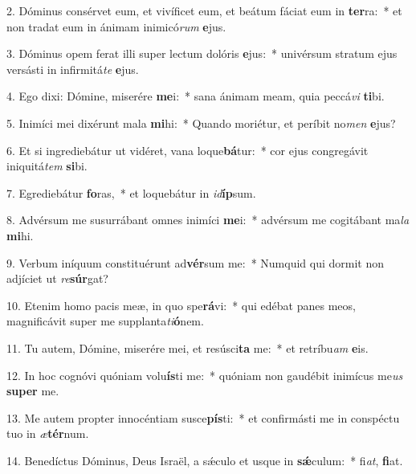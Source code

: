 2. Dóminus consérvet eum, et vivíficet eum, et beátum fáciat eum in \textbf{ter}ra:~*  et non tradat eum in ánimam inimicó\textit{rum} \textbf{e}jus.\

3. Dóminus opem ferat illi super lectum dolóris \textbf{e}jus:~*  univérsum stratum ejus versásti in infirmitá\textit{te} \textbf{e}jus.\

4. Ego dixi: Dómine, miserére \textbf{me}i:~*  sana ánimam meam, quia peccá\textit{vi} \textbf{ti}bi.\

5. Inimíci mei dixérunt mala \textbf{mi}hi:~*  Quando moriétur, et períbit no\textit{men} \textbf{e}jus?\

6. Et si ingrediebátur ut vidéret, vana loque\textbf{bá}tur:~*  cor ejus congregávit iniquitá\textit{tem} \textbf{si}bi.\

7. Egrediebátur \textbf{fo}ras,~*  et loquebátur in \textit{id}\textbf{íp}sum.\

8. Advérsum me susurrábant omnes inimíci \textbf{me}i:~*  advérsum me cogitábant ma\textit{la} \textbf{mi}hi.\

9. Verbum iníquum constituérunt ad\textbf{vér}sum me:~*  Numquid qui dormit non adjíciet ut \textit{re}\textbf{súr}gat?\

10. Etenim homo pacis meæ, in quo spe\textbf{rá}vi:~*  qui edébat panes meos, magnificávit super me supplanta\textit{ti}\textbf{ó}nem.\

11. Tu autem, Dómine, miserére mei, et resúsci\textbf{ta} me:~*  et retríbu\textit{am} \textbf{e}is.\

12. In hoc cognóvi quóniam volu\textbf{ís}ti me:~*  quóniam non gaudébit inimícus me\textit{us} \textbf{su}\textbf{per} me.\

13. Me autem propter innocéntiam susce\textbf{pís}ti:~*  et confirmásti me in conspéctu tuo in \textit{æ}\textbf{tér}num.\

14. Benedíctus Dóminus, Deus Israël, a sǽculo et usque in \textbf{sǽ}culum:~*  fi\textit{at}, \textbf{fi}at.\

